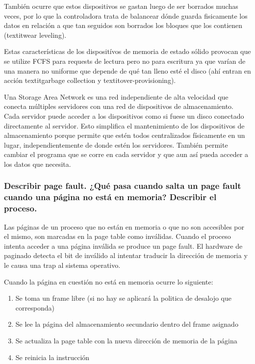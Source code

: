 También ocurre que estos dispositivos se gastan luego de ser borrados muchas veces, por lo que la controladora trata de balancear dónde guarda fisicamente los datos en relación a que tan seguidos son borrados los bloques que los contienen (textit{wear leveling}).

Estas características de los dispositívos de memoria de estado sólido provocan que se utilize FCFS para requests de lectura pero no para escritura ya que varían de una manera no uniforme que depende de qué tan lleno esté el disco (ahí entran en acción textit{garbage collection} y textit{over-provisioning}).

Una Storage Area Network es una red independiente de alta velocidad que conecta múltiples servidores con una red de dispositivos de almacenamiento. Cada servidor puede acceder a los dispositivos como si fuese un disco conectado directamente al servidor. Esto simplifica el mantenimiento de los dispositivos de almacenamiento porque permite que estén todos centralizados físicamente en un lugar, independientemente de donde estén los servidores. También permite cambiar el programa que se corre en cada servidor y que aun así pueda acceder a los datos que necesita.

\subsubsection{Describir page fault. ¿Qué pasa cuando salta un page fault cuando una página no está en memoria? Describir el proceso.}

Las páginas de un proceso que no están en memoria o que no son accesibles por el mismo, son marcadas en la page table como inválidas. Cuando el proceso intenta acceder a una página inválida se produce un page fault. El hardware de paginado detecta el bit de inválido al intentar traducir la dirección de memoria y le causa una trap al sistema operativo.

Cuando la página en cuestión no está en memoria ocurre lo siguiente:
\begin{enumerate}
\item Se toma un frame libre (si no hay se aplicará la politica de desalojo que corresponda) \\
\item Se lee la página del almacenamiento secundario dentro del frame asignado \\
\item Se actualiza la page table con la nueva dirección de memoria de la página \\
\item Se reinicia la instrucción
\end{enumerate}

